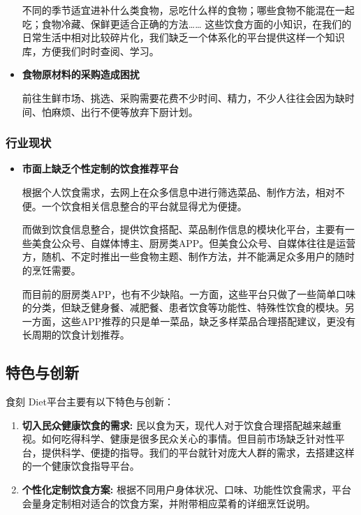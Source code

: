 \documentclass[UTF8,12pt]{ctexart}
\numberwithin{figure}{section}%
\begin{document}
\begin{spacing}{2}
\begin{itemize}
		\setlength{\parindent}{2em}
		不同的季节适宜进补什么类食物，忌吃什么样的食物；哪些食物不能混在一起吃；食物冷藏、保鲜更适合正确的方法…… 这些饮食方面的小知识，在我们的日常生活中相对比较碎片化，我们缺乏一个体系化的平台提供这样一个知识库，方便我们时时查阅、学习。		
		
		\item[*] \textbf{食物原材料的采购造成困扰}
		
		\setlength{\parindent}{2em}前往生鲜市场、挑选、采购需要花费不少时间、精力，不少人往往会因为缺时间、怕麻烦、出行不便等放弃下厨计划。				
	\end{itemize}

\subsubsection{行业现状}
	\begin{itemize}
		\item[*] \textbf{市面上缺乏个性定制的饮食推荐平台}
		
		\setlength{\parindent}{2em}根据个人饮食需求，去网上在众多信息中进行筛选菜品、制作方法，相对不便。一个饮食相关信息整合的平台就显得尤为便捷。
		
		而做到饮食信息整合，提供饮食搭配、菜品制作信息的模块化平台，主要有一些美食公众号、自媒体博主、厨房类APP。但美食公众号、自媒体往往是运营方，随机、不定时推出一些食物主题、制作方法，并不能满足众多用户的随时的烹饪需要。
		
		而目前的厨房类APP，也有不少缺陷。一方面，这些平台只做了一些简单口味的分类，但缺乏健身餐、减肥餐、患者饮食等功能性、特殊性饮食的模块。另一方面，这些APP推荐的只是单一菜品，缺乏多样菜品合理搭配建议，更没有长周期的饮食计划推荐。
	\end{itemize}

\subsection{特色与创新}
食刻 Diet平台主要有以下特色与创新：
\begin{enumerate}
	\item[(1)] \textbf{切入民众健康饮食的需求: }民以食为天，现代人对于饮食合理搭配越来越重视。如何吃得科学、健康是很多民众关心的事情。但目前市场缺乏针对性平台，提供科学、便捷的指导。我们的平台就针对庞大人群的需求，去搭建这样的一个健康饮食指导平台。
	
	\item[(2)] \textbf{个性化定制饮食方案: }根据不同用户身体状况、口味、功能性饮食需求，平台会量身定制相对适合的饮食方案，并附带相应菜肴的详细烹饪说明。
	

\end{enumerate}
\end{spacing}
\end{document}
